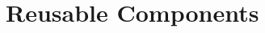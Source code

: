 \documentclass[conference]{IEEEtran}
\begin{document}
%
%
%

\section{Reusable Components}
\label{s:reusable-components}

\end{document}
